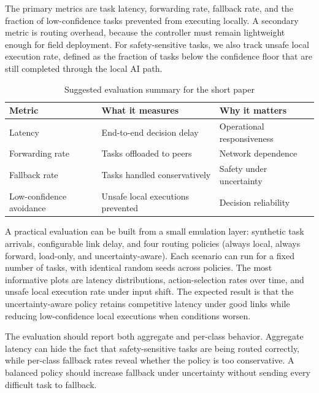 \documentclass[10pt, conference]{IEEEtran}
\begin{document}
The primary metrics are task latency, forwarding rate, fallback rate, and the fraction of low-confidence tasks prevented from executing locally. A secondary metric is routing overhead, because the controller must remain lightweight enough for field deployment. For safety-sensitive tasks, we also track unsafe local execution rate, defined as the fraction of tasks below the confidence floor that are still completed through the local AI path.

\begin{table}[t]
\centering
\caption{Suggested evaluation summary for the short paper}
\label{tab:eval}
\footnotesize
\setlength{\tabcolsep}{3pt}
\begin{tabularx}{\columnwidth}{@{}>{\raggedright\arraybackslash}p{}>{\raggedright\arraybackslash}X>{\raggedright\arraybackslash}X@{}}
\toprule
Metric & What it measures & Why it matters \\
\midrule
Latency & End-to-end decision delay & Operational responsiveness \\
Forwarding rate & Tasks offloaded to peers & Network dependence \\
Fallback rate & Tasks handled conservatively & Safety under uncertainty \\
Low-confidence avoidance & Unsafe local executions prevented & Decision reliability \\
\bottomrule
\end{tabularx}
\end{table}

A practical evaluation can be built from a small emulation layer: synthetic task arrivals, configurable link delay, and four routing policies (always local, always forward, load-only, and uncertainty-aware). Each scenario can run for a fixed number of tasks, with identical random seeds across policies. The most informative plots are latency distributions, action-selection rates over time, and unsafe local execution rate under input shift. The expected result is that the uncertainty-aware policy retains competitive latency under good links while reducing low-confidence local executions when conditions worsen.

The evaluation should report both aggregate and per-class behavior. Aggregate latency can hide the fact that safety-sensitive tasks are being routed correctly, while per-class fallback rates reveal whether the policy is too conservative. A balanced policy should increase fallback under uncertainty without sending every difficult task to fallback.
\end{document}
